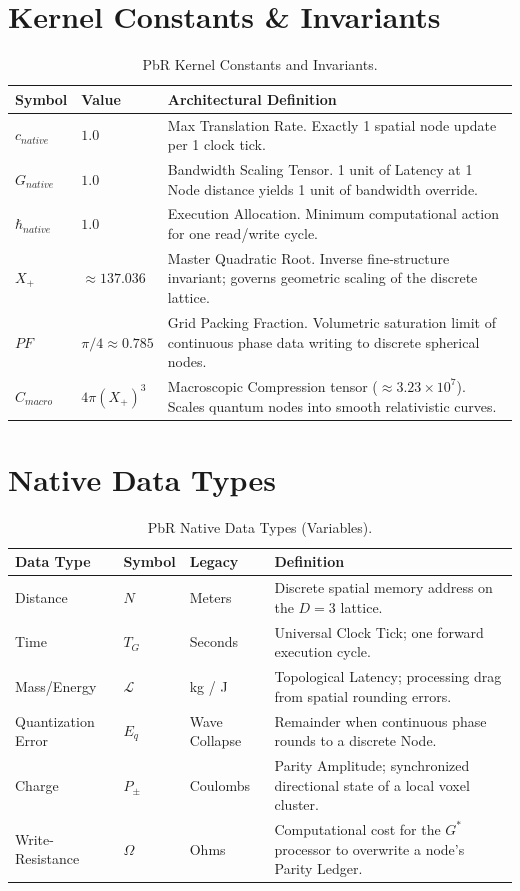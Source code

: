\documentclass[12pt, a4paper]{article}
\begin{document}
\section{Kernel Constants \& Invariants}

\begin{table}[h!]
\centering
\small
\begin{tabular}{@{}llL{6.2cm}@{}}
\toprule
\textbf{Symbol} & \textbf{Value} & \textbf{Architectural Definition} \\
\midrule
$c_{native}$ & $1.0$ & Max Translation Rate. Exactly 1 spatial node update per 1 clock tick. \\[4pt]
$G_{native}$ & $1.0$ & Bandwidth Scaling Tensor. 1 unit of Latency at 1 Node distance yields 1 unit of bandwidth override. \\[4pt]
$\hbar_{native}$ & $1.0$ & Execution Allocation. Minimum computational action for one read/write cycle. \\[4pt]
$X_+$ & $\approx 137.036$ & Master Quadratic Root. Inverse fine-structure invariant; governs geometric scaling of the discrete lattice. \\[4pt]
$PF$ & $\pi/4 \approx 0.785$ & Grid Packing Fraction. Volumetric saturation limit of continuous phase data writing to discrete spherical nodes. \\[4pt]
$\hat{C}_{macro}$ & $4\pi(X_+)^3$ & Macroscopic Compression tensor ($\approx 3.23 \times 10^7$). Scales quantum nodes into smooth relativistic curves. \\
\bottomrule
\end{tabular}
\caption{PbR Kernel Constants and Invariants.}
\end{table}

\section{Native Data Types}

\begin{table}[h!]
\centering
\small
\begin{tabular}{@{}lllL{5.5cm}@{}}
\toprule
\textbf{Data Type} & \textbf{Symbol} & \textbf{Legacy} & \textbf{Definition} \\
\midrule
Distance & $N$ & Meters & Discrete spatial memory address on the $D=3$ lattice. \\[4pt]
Time & $T_G$ & Seconds & Universal Clock Tick; one forward execution cycle. \\[4pt]
Mass/Energy & $\mathcal{L}$ & kg / J & Topological Latency; processing drag from spatial rounding errors. \\[4pt]
Quantization Error & $E_q$ & Wave Collapse & Remainder when continuous phase rounds to a discrete Node. \\[4pt]
Charge & $P_{\pm}$ & Coulombs & Parity Amplitude; synchronized directional state of a local voxel cluster. \\[4pt]
Write-Resistance & $\Omega$ & Ohms & Computational cost for the $G^*$ processor to overwrite a node's Parity Ledger. \\
\bottomrule
\end{tabular}
\caption{PbR Native Data Types (Variables).}
\end{table}
\end{document}
